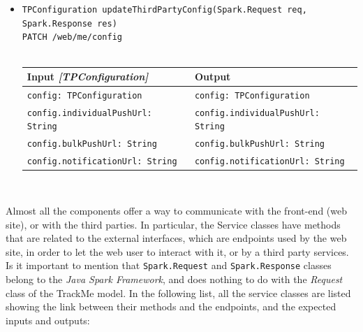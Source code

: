 \documentclass[a4paper, hidelinks, 12pt]{report}
\begin{document}
\begin{itemize}
\begin{itemize}
\begin{itemize}
\begin{tabular}{l | l}
				\end{tabular}\\
				
		\item{\verb|TPConfiguration updateThirdPartyConfig(Spark.Request req,|\\ \verb|Spark.Response res)|\\ \verb|PATCH /web/me/config|}\\\\
			\begin{tabular}{l | l}
			\textbf{Input} \textit{[TPConfiguration]} & \textbf{Output} \\
			\hline
				\verb|config: TPConfiguration| & \verb|config: TPConfiguration| \\
				\verb|config.individualPushUrl: String|& \verb|config.individualPushUrl: String| \\
				\verb|config.bulkPushUrl: String|& \verb|config.bulkPushUrl: String| \\
				\verb|config.notificationUrl: String|& \verb|config.notificationUrl: String| \\
			\end{tabular}\\
                			
		\end{itemize}
		
	\end{itemize}
\end{itemize}
	
	Almost all the components offer a way to communicate with the front-end (web site), or with the third parties. In particular, the Service classes have methods that are related to the external interfaces, which are endpoints used by the web site, in order to let the web user to interact with it, or by a third party services. Is it important to mention that \verb|Spark.Request| and \verb|Spark.Response| classes belong to the \textit{Java Spark Framework}, and does nothing to do with the \textit{Request} class of the TrackMe model. In the following list, all the service classes are listed showing the link between their methods and the endpoints, and the expected inputs and outputs:
	
\end{document}
